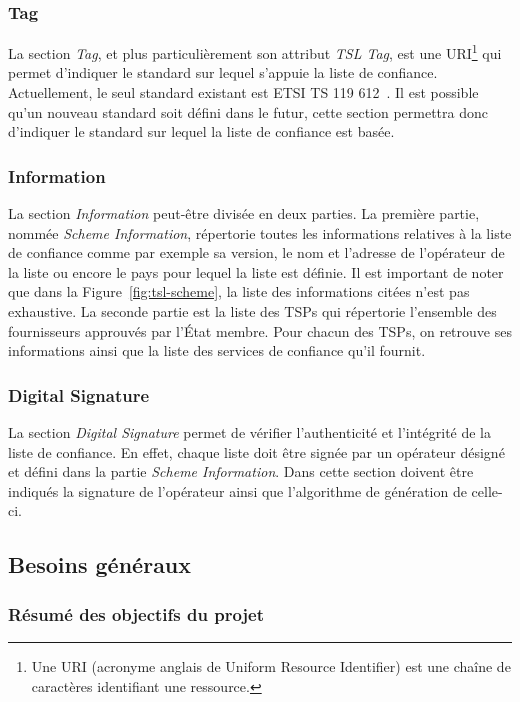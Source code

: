 \documentclass{tnreport}
\begin{document}
\subsubsection{Tag}

La section \textit{Tag}, et plus particulièrement son attribut \textit{TSL Tag}, est une URI\footnote{Une URI (acronyme anglais de Uniform Resource Identifier) est une chaîne de caractères identifiant une ressource.} qui permet d'indiquer le standard sur lequel s'appuie la liste de confiance. Actuellement, le seul standard  existant est ETSI TS 119 612~\cite{ETSITS119612}. Il est possible qu'un nouveau standard soit défini dans le futur, cette section permettra donc d'indiquer le standard sur lequel la liste de confiance est basée.

\subsubsection{Information}

La section \textit{Information} peut-être divisée en deux parties. 
La première partie, nommée \textit{Scheme Information}, répertorie toutes les informations relatives à la liste de confiance comme par exemple sa version, le nom et l'adresse de l'opérateur de la liste ou encore le pays pour lequel la liste est définie. Il est important de noter que dans la Figure~\ref{fig:tsl-scheme}, la liste des informations citées n'est pas exhaustive. 
La seconde partie est la liste des TSPs qui répertorie l'ensemble des fournisseurs approuvés par l'État membre. Pour chacun des TSPs, on retrouve ses informations ainsi que la liste des services de confiance qu'il fournit.

\subsubsection{Digital Signature}

La section \textit{Digital Signature} permet de vérifier l'authenticité et l'intégrité de la liste de confiance. En effet, chaque liste doit être signée par un opérateur désigné et défini dans la partie \textit{Scheme Information}. Dans cette section doivent être indiqués la signature de l'opérateur ainsi que l'algorithme de génération de celle-ci.

\subsection{Besoins généraux}

\subsubsection{Résumé des objectifs du projet}
\end{document}
